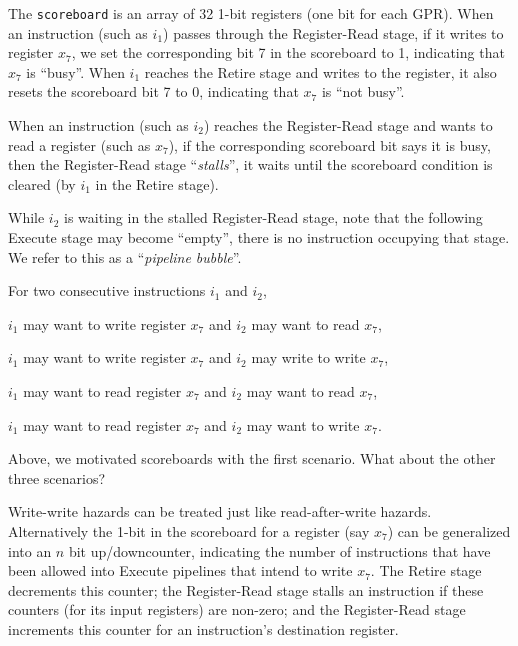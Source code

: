 The \verb|scoreboard| is an array of 32 1-bit registers (one bit for
each GPR).  When an instruction (such as $i_1$) passes through the
Register-Read stage, if it writes to register $x_7$, we set the
corresponding bit 7 in the scoreboard to 1, indicating that $x_7$ is
``busy''.  When $i_1$ reaches the Retire stage and writes to the
register, it also resets the scoreboard bit 7 to 0, indicating that
$x_7$ is ``not busy''.

When an instruction (such as $i_2$) reaches the Register-Read stage
and wants to read a register (such as $x_7$), if the corresponding
scoreboard bit says it is busy, then the Register-Read stage
``\emph{stalls}'', {\ie} it waits until the scoreboard condition is
cleared (by $i_1$ in the Retire stage).


While $i_2$ is waiting in the stalled Register-Read stage, note that
the following Execute stage may become ``empty'', {\ie} there is no
instruction occupying that stage.  We refer to this as a
``\emph{pipeline bubble}''.

\hdivider

\Exercise

For two consecutive instructions $i_1$ and $i_2$,
  \begin{tightlist}
    \item $i_1$ may want to write register $x_7$ and $i_2$ may want to read $x_7$,
    \item $i_1$ may want to write register $x_7$ and $i_2$ may write to write $x_7$,
    \item $i_1$ may want to read register $x_7$ and $i_2$ may want to read $x_7$,
    \item $i_1$ may want to read register $x_7$ and $i_2$ may want to write $x_7$.
  \end{tightlist}
Above, we motivated scoreboards with the first scenario.  What about
the other three scenarios?

\Exercise

Write-write hazards can be treated just like read-after-write hazards.
Alternatively the 1-bit in the scoreboard for a register (say $x_7$)
can be generalized into an $n$ bit up/downcounter, indicating the
number of instructions that have been allowed into Execute pipelines
that intend to write $x_7$.  The Retire stage decrements this counter;
the Register-Read stage stalls an instruction if these counters (for
its input registers) are non-zero; and the Register-Read stage
increments this counter for an instruction's destination register.

